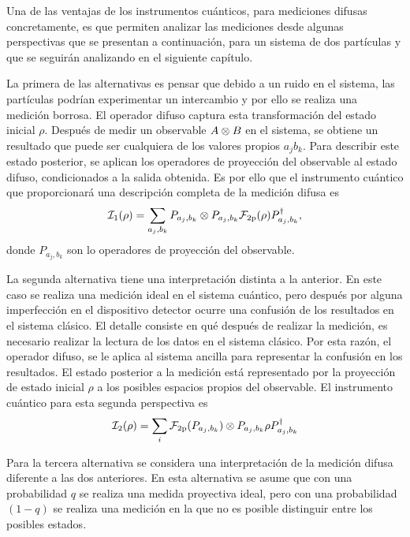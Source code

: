 Una de las ventajas de los instrumentos cuánticos, para mediciones difusas
concretamente, es que permiten analizar las mediciones desde algunas
perspectivas que se presentan a continuación, para un sistema de  dos
partículas y que se seguirán analizando en el siguiente capítulo.


La primera de las alternativas es pensar que debido a un ruido en el sistema,
las partículas podrían experimentar un intercambio y por ello se realiza una
medición borrosa. El operador difuso captura esta transformación del estado
inicial $\rho$. Después de medir un observable ${A \otimes B}$ en el sistema,
se obtiene un resultado que puede ser cualquiera de los valores propios $a_j
b_k$. Para describir este estado posterior, se aplican los operadores de
proyección del observable al estado difuso, condicionados a la salida obtenida.
Es por ello que el instrumento cuántico que proporcionará una descripción
completa de la medición difusa es
\begin{equation}\label{eq:primer-instrumento-general}
    \mathcal{I}_{1}(\rho)=\sum_{a_j, b_k} P_{a_j,b_k}\otimes P_{a_j,b_k}\mathcal{F}_{2\text{p}}(\rho)P_{a_j,b_k}^\dagger,
\end{equation}  
donde $P_{a_j,b_k}$ son lo operadores de proyección del observable.



    La segunda alternativa tiene una interpretación distinta a la anterior. En este caso se realiza una medición ideal en el sistema cuántico, pero después por alguna imperfección en el dispositivo detector ocurre una confusión de los resultados en el sistema clásico. El detalle consiste en qué después de realizar la medición, es necesario realizar la lectura de los datos en el sistema clásico. Por esta razón, el operador difuso, se le aplica al sistema ancilla para representar la confusión en los resultados. El estado posterior a la medición está representado por la proyección de estado inicial $\rho$ a los posibles espacios propios del observable. El instrumento cuántico para esta segunda perspectiva es\begin{equation}\label{eq:segundo-instrumento-ciuantico}
        \mathcal{I}_2(\rho)=\sum_i\mathcal{F}_{2\text{p}}(P_{a_j,b_k})\otimes P_{a_j,b_k}\rho P_{a_j,b_k}^\dagger
    \end{equation} 
    

    Para la tercera alternativa se considera una interpretación de la medición difusa diferente a las dos anteriores. En esta alternativa se asume que con una probabilidad $q$ se realiza una medida proyectiva ideal, pero con una probabilidad $(1-q)$ se realiza una medición en la que no es posible distinguir entre los posibles estados.
  

